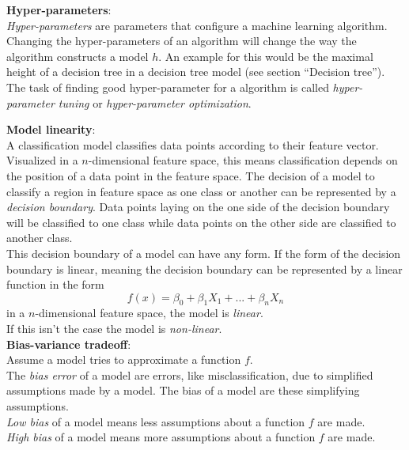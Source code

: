 \textbf{Hyper-parameters}: \\
\emph{Hyper-parameters} are parameters that configure a machine learning algorithm. Changing the hyper-parameters of an algorithm will change the way the algorithm constructs a model $h$. An example for this would be the maximal height of a decision tree in a decision tree model (see section ``Decision tree''). The task of finding good hyper-parameter for a algorithm is called \emph{hyper-parameter tuning} or \emph{hyper-parameter optimization}.

\textbf{Model linearity}: \\
A classification model classifies data points according to their feature vector. Visualized in a $n$-dimensional feature space, this means classification depends on the position of a data point in the feature space. The decision of a model to classify a region in feature space as one class or another can be represented by a \emph{decision boundary}. Data points laying on the one side of the decision boundary will be classified to one class while data points on the other side are classified to another class.
\\

This decision boundary of a model can have any form. If the form of the decision boundary is linear, meaning the decision boundary can be represented by a linear function in the form 
\begin{equation} \label{eq:1}
f(x)=\beta_0 + \beta_1 X_1 + ... + \beta_n X_n
\end{equation}
in a $n$-dimensional feature space, the model is \emph{linear}.\\
If this isn't the case the model is \emph{non-linear}.
\\

\textbf{Bias-variance tradeoff}: \\
Assume a model tries to approximate a function $f$.
\\

The \emph{bias error} of a model are errors, like misclassification, due to simplified assumptions made by a model. The bias of a model are these simplifying assumptions. 
\\
\emph{Low bias} of a model means less assumptions about a function $f$ are made. 
\\
\emph{High bias} of a model means more assumptions about a function $f$ are made. 
\\

